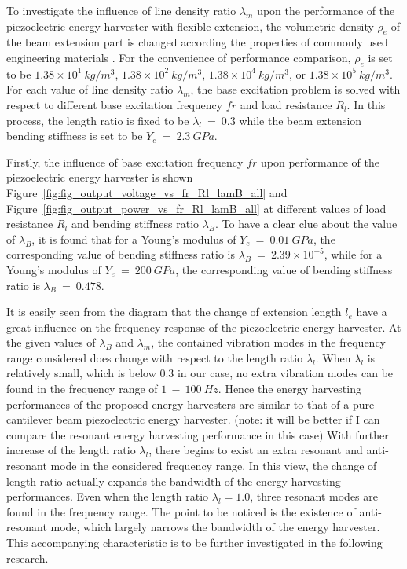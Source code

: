 \documentclass{elsarticle}
\begin{document}
To investigate the influence of line density ratio $\lambda_m$ upon the performance of the piezoelectric energy harvester with flexible extension, the volumetric density $\rho_e$ of the beam extension part is changed according the properties of commonly used engineering materials \cite{warlimont2018springer}. For the convenience of performance comparison, $\rho_e$ is set to be $1.38\times10^1\ kg/m^3$, $1.38\times10^2\ kg/m^3$, $1.38\times10^4\ kg/m^3$, or $1.38\times10^5\ kg/m^3$. For each value of line density ratio $\lambda_m$, the base excitation problem is solved with respect to different base excitation frequency $fr$ and load resistance $R_l$. In this process, the length ratio is fixed to be $\lambda_l\ =\ 0.3$ while the beam extension bending stiffness is set to be $Y_e\ =\ 2.3\ GPa$.

Firstly, the influence of base excitation frequency $fr$ upon performance of the piezoelectric energy harvester is shown Figure~\ref{fig:fig_output_voltage_vs_fr_Rl_lamB_all} and Figure~\ref{fig:fig_output_power_vs_fr_Rl_lamB_all} at different values of load resistance $R_l$ and bending stiffness ratio $\lambda_B$. To have a clear clue about the value of $\lambda_B$, it is found that for a Young's modulus of $Y_e\ =\ 0.01\ GPa$, the corresponding value of bending stiffness ratio is $\lambda_B\ =\ 2.39\times10^{-5}$, while for a Young's modulus of $Y_e\ =\ 200\ GPa$, the corresponding value of bending stiffness ratio is $\lambda_B\ =\ 0.478$.


It is easily seen from the diagram that the change of extension length $l_e$ have a great influence on the frequency response of the piezoelectric energy harvester. At the given values of $\lambda_B$ and $\lambda_m$, the contained vibration modes in the frequency range considered does change with respect to
the length ratio $\lambda_l$. When $\lambda_l$ is relatively small, which is below $0.3$ in our case, no extra vibration modes can be found in the frequency range of $1\ - \ 100\ Hz$. Hence the energy harvesting performances of the proposed energy harvesters are similar to that of a pure cantilever beam piezoelectric energy harvester. (note: it will be better if I can compare the resonant energy harvesting performance in this case) With further increase of the length ratio $\lambda_l$, there begins to exist an extra resonant and anti-resonant mode in the considered frequency range. In this view, the change of length ratio actually expands the bandwidth of the energy harvesting performances. Even when the length ratio $\lambda_l = 1.0$, three resonant modes are found in the frequency range. The point to be noticed is the existence of anti-resonant mode, which largely narrows the bandwidth of the energy harvester. This accompanying characteristic is to be further investigated in the following research. 
\end{document}
